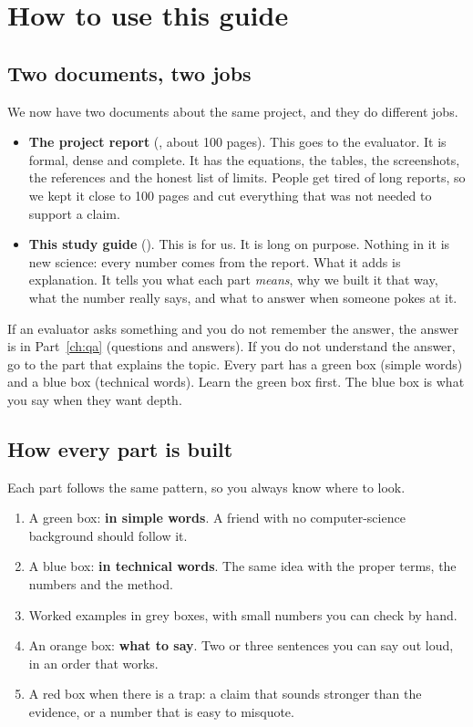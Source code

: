 \chapter{How to use this guide}
\label{ch:howto}

\section{Two documents, two jobs}
We now have two documents about the same project, and they do different jobs.

\begin{itemize}
\item \textbf{The project report} (, about 100 pages). This goes to the evaluator. It is formal, dense and complete. It has the equations, the tables, the screenshots, the references and the honest list of limits. People get tired of long reports, so we kept it close to 100 pages and cut everything that was not needed to support a claim.
\item \textbf{This study guide} (). This is for us. It is long on purpose. Nothing in it is new science: every number comes from the report. What it adds is explanation. It tells you what each part \emph{means}, why we built it that way, what the number really says, and what to answer when someone pokes at it.
\end{itemize}

\begin{saybox}
If an evaluator asks something and you do not remember the answer, the answer is in Part~\ref{ch:qa} (questions and answers). If you do not understand the answer, go to the part that explains the topic. Every part has a green box (simple words) and a blue box (technical words). Learn the green box first. The blue box is what you say when they want depth.
\end{saybox}

\section{How every part is built}
Each part follows the same pattern, so you always know where to look.

\begin{enumerate}
\item A green box: \textbf{in simple words}. A friend with no computer-science background should follow it.
\item A blue box: \textbf{in technical words}. The same idea with the proper terms, the numbers and the method.
\item Worked examples in grey boxes, with small numbers you can check by hand.
\item An orange box: \textbf{what to say}. Two or three sentences you can say out loud, in an order that works.
\item A red box when there is a trap: a claim that sounds stronger than the evidence, or a number that is easy to misquote.
\end{enumerate}

